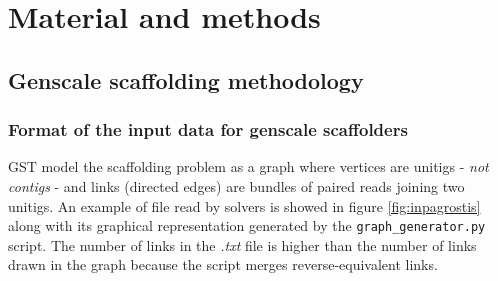 \documentclass[12pt, twocolumn]{article}
\begin{document}

\newpage
\section{Material and methods} \label{sec:MatMet}
\subsection{Genscale scaffolding methodology}\label{sec:genscafmeth}
\subsubsection{Format of the input data for genscale scaffolders}
GST model the scaffolding problem as a graph where vertices are unitigs - \textit{not contigs} - and links (directed edges) are bundles of paired reads joining two unitigs. An example of file read by solvers is showed in figure \ref{fig:inpagrostis} along with its graphical representation generated by the \texttt{graph\_generator.py} script. The number of links in the \textit{.txt} file is higher than the number of links drawn in the graph because the script merges reverse-equivalent links.
\end{document}
